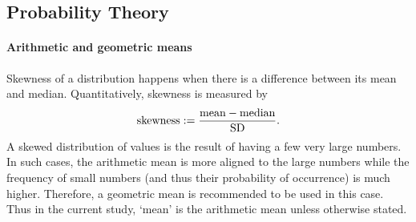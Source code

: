 \subsection{Probability Theory}
	\paragraph{Arithmetic and geometric means} Skewness of a distribution happens when there is a difference between its mean and median. Quantitatively, skewness is measured by
	\begin{equation}
		\text{skewness} \mathrel{:=} \frac{\text{mean}-\text{median}}{\text{SD}}.
	\end{equation}
	A skewed distribution of values is the result of having a few very large numbers. In such cases, the arithmetic mean is more aligned to the large numbers while the frequency of small numbers (and thus their probability of occurrence) is much higher. Therefore, a geometric mean is recommended to be used in this case. Thus in the current study, `mean' is the arithmetic mean unless otherwise stated. 
	
